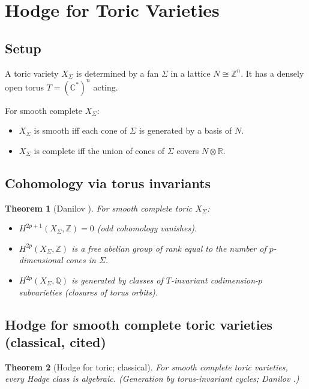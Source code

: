 \documentclass[11pt, a4paper]{amsart}
\newtheorem{theorem}{Theorem}[section]
\theoremstyle{definition}
\newcommand{\R}{\mathbb{R}}
\newcommand{\Q}{\mathbb{Q}}
\newcommand{\C}{\mathbb{C}}
\newcommand{\Z}{\mathbb{Z}}
\begin{document}
\section{Hodge for Toric Varieties}\label{sec:toric}

\subsection{Setup}

A toric variety $X_\Sigma$ is determined by a fan $\Sigma$ in a lattice
$N \cong \Z^n$. It has a densely open torus $T = (\C^*)^n$ acting.

For smooth complete $X_\Sigma$:
\begin{itemize}
\item $X_\Sigma$ is smooth iff each cone of $\Sigma$ is generated by
    a basis of $N$.
\item $X_\Sigma$ is complete iff the union of cones of $\Sigma$ covers $N \otimes \R$.
\end{itemize}

\subsection{Cohomology via torus invariants}

\begin{theorem}[Danilov \cite{Danilov1978}]\label{thm:danilov}
For smooth complete toric $X_\Sigma$:
\begin{itemize}
\item $H^{2p+1}(X_\Sigma, \Z) = 0$ (odd cohomology vanishes).
\item $H^{2p}(X_\Sigma, \Z)$ is a free abelian group of rank equal
    to the number of $p$-dimensional cones in $\Sigma$.
\item $H^{2p}(X_\Sigma, \Q)$ is generated by classes of $T$-invariant
    codimension-$p$ subvarieties (closures of torus orbits).
\end{itemize}
\end{theorem}

\subsection{Hodge for smooth complete toric varieties (classical, cited)}

\begin{theorem}[Hodge for toric; classical]\label{thm:toric}
For smooth complete toric varieties, every Hodge class is algebraic. (Generation by torus-invariant cycles; Danilov \cite{Danilov}.)
\end{theorem}
\end{document}
